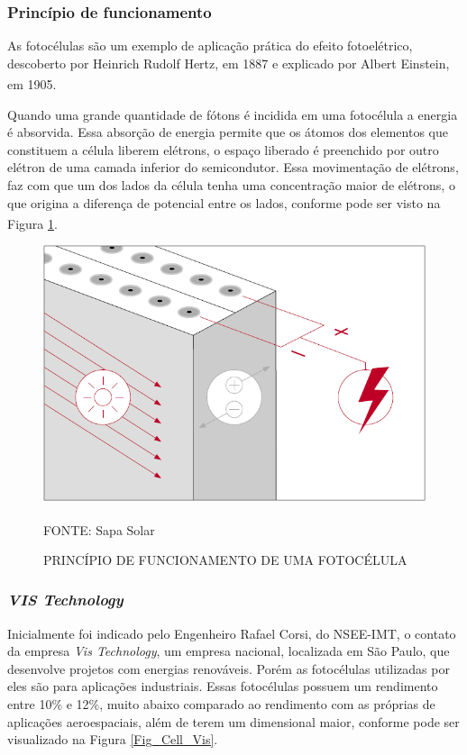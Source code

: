 \documentclass[
	12pt,				%
	openright,			%
	oneside,			%
	a4paper,			%
	english,			%
	french,				%
	spanish,			%
	brazil,				%
	oldfontcommands
	]{abntex2}
\begin{document}
\subsubsection[Princípio de funcionamento]{Princípio de funcionamento}

	As fotocélulas são um exemplo de aplicação prática do efeito fotoelétrico, descoberto por Heinrich Rudolf Hertz, em 1887 e explicado por Albert Einstein, em 1905.\textsuperscript{\cite{celula}}
	
	Quando uma grande quantidade de fótons é incidida em uma fotocélula a energia é absorvida. Essa absorção de energia permite que os átomos dos elementos que constituem a célula liberem elétrons, o espaço liberado é preenchido por outro elétron de uma camada inferior do semicondutor. Essa movimentação de elétrons, faz com que um dos lados da célula tenha uma concentração maior de elétrons, o que origina a diferença de potencial entre os lados, conforme pode ser visto na Figura \ref{Fig_PF_Cell}.\textsuperscript{\cite{celula2}}
	
	\begin{figure}[th]
		\caption{PRINCÍPIO DE FUNCIONAMENTO DE UMA FOTOCÉLULA}
		\label{Fig_PF_Cell}
		\centering
		\includegraphics[width=0.6\linewidth]{./figs/fotocelula}
			
		\begin{small}
			FONTE: Sapa Solar\textsuperscript{\cite{celula2}}
		\end{small}		
	\end{figure}

\subsubsection[VIS Technology]{\textit{VIS Technology}}
	
	Inicialmente foi indicado pelo Engenheiro Rafael Corsi, do NSEE-IMT, o contato da empresa \textit{Vis Technology}, um empresa nacional, localizada em São Paulo, que desenvolve projetos com energias renováveis. Porém as fotocélulas utilizadas por eles são para aplicações industriais. Essas fotocélulas possuem um rendimento entre 10\% e 12\%, muito abaixo comparado ao rendimento com as próprias de aplicações aeroespaciais, além de terem um dimensional maior, conforme pode ser visualizado na Figura \ref{Fig_Cell_Vis}.
	
\end{document}
